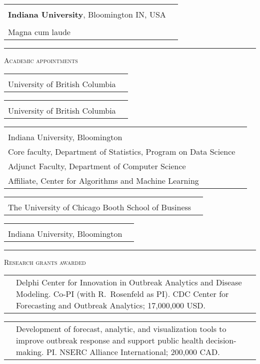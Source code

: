 \documentclass[11pt,letterpaper]{minimal/moderncv}
\makeatletter
\newcommand{\xx}{\textcolor{white}{2022}}
\newcommand{\jog}{\hspace*{2ex}}
\renewcommand{\cventry}[2]{\cvitem{#1}{\begin{minipage}[t]{\maincolumnwidth}#2\end{minipage}}}
\renewcommand{\section}[1]{  \par\addvspace{15pt}%
  \parbox[t]{\hintscolumnwidth}{\strut\raggedleft\raisebox{4pt}%
  {\rule{\hintscolumnwidth}{2pt}}}%
  \hspace{\separatorcolumnwidth}%
  \textsc{\Large #1}\par\nobreak\addvspace{6pt}%
}
\renewcommand*{\cvitem}[2]{%
  \begin{tabular}{@{}p{\hintscolumnwidth}@{\hspace{\separatorcolumnwidth}}%
    p{\maincolumnwidth}@{}}%
    \raggedleft {#1} &  {#2}%
  \end{tabular}%
}
\makeatother
\begin{document}
\vspace{3pt}
\cventry{2006}{Bachelor of Science in Music and an Outside Field\\
\textbf{Indiana 
University}, Bloomington IN, USA \\{\small Majors: Cello Performance and
Mathematics\\ \jog Magna cum laude}}


\section{Academic appointments}

\cventry{2025--\xx}{\textbf{Professor of Statistics}\\University of
British Columbia}

\cventry{2020--2025}{\textbf{Associate Professor of Statistics}\\University of British Columbia}

\vspace{3pt}
\cventry{2018--2020}{\textbf{Associate Professor of Statistics}\\Indiana
University, Bloomington \\ Core faculty, 
Department of Statistics, Program on Data Science \\ Adjunct
Faculty, Department of Computer Science \\ Affiliate, Center for
Algorithms and Machine Learning}

\vspace{3pt} 
\cventry{2018--2019}{\textbf{Visiting Associate Professor of Econometrics and
Statistics}\\The University of Chicago Booth School of Business} 

\vspace{3pt}
\cventry{2012--2018}{\textbf{Assistant Professor of Statistics}\\Indiana
University, Bloomington} 

\section{Research grants awarded}

\cvitem{2023--2028}{Delphi Center for Innovation in Outbreak Analytics and
Disease Modeling. Co-PI (with R.\ Rosenfeld as PI). CDC Center for Forecasting
and Outbreak Analytics; 17,000,000 USD. }

\cvitem{2023--2025}{Development of forecast, analytic, and visualization tools
to improve outbreak response and support public health decision-making. PI.
NSERC Alliance International; 200,000 CAD.}
\end{document}
